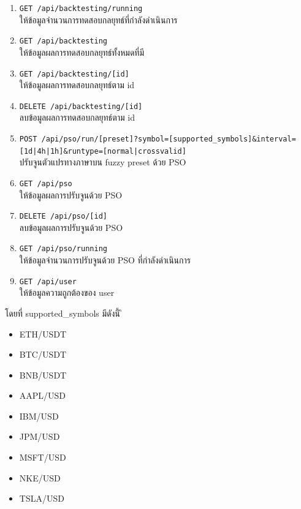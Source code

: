 \begin{enumerate}
    \item \texttt{GET {\footnotesize /api/backtesting/running}} \\ให้ข้อมูลจำนวนการทดสอบกลยุทธ์ที่กำลังดำเนินการ
    \item \texttt{GET {\footnotesize /api/backtesting}} \\ให้ข้อมูลผลการทดสอบกลยุทธ์ทั้งหมดที่มี
    \item \texttt{GET {\footnotesize /api/backtesting/[id]}} \\ให้ข้อมูลผลการทดสอบกลยุทธ์ตาม id
    \item \texttt{DELETE {\footnotesize /api/backtesting/[id]}} \\ลบข้อมูลผลการทดสอบกลยุทธ์ตาม id
    \item \texttt{POST {\footnotesize /api/pso/run/[preset]?symbol=[supported\_symbols]\&interval=[1d|4h|1h]\&runtype=[normal|crossvalid]}} \\ปรับจูนตัวแปรทางภาษาบน fuzzy preset ด้วย PSO
    \item \texttt{GET {\footnotesize /api/pso}} \\ให้ข้อมูลผลการปรับจูนด้วย PSO
    \item \texttt{DELETE {\footnotesize /api/pso/[id]}} \\ลบข้อมูลผลการปรับจูนด้วย PSO
    \item \texttt{GET {\footnotesize /api/pso/running}} \\ให้ข้อมูลจำนวนการปรับจูนด้วย PSO ที่กำลังดำเนินการ
    \item \texttt{GET {\footnotesize /api/user}} \\ให้ข้อมูลความถูกต้องของ user
\end{enumerate}
โดยที่ supported\_symbols มีดังนี้
ิ\begin{itemize}
    \item ETH/USDT
    \item BTC/USDT
    \item BNB/USDT
    \item AAPL/USD
    \item IBM/USD
    \item JPM/USD
    \item MSFT/USD
    \item NKE/USD
    \item TSLA/USD
\end{itemize}

